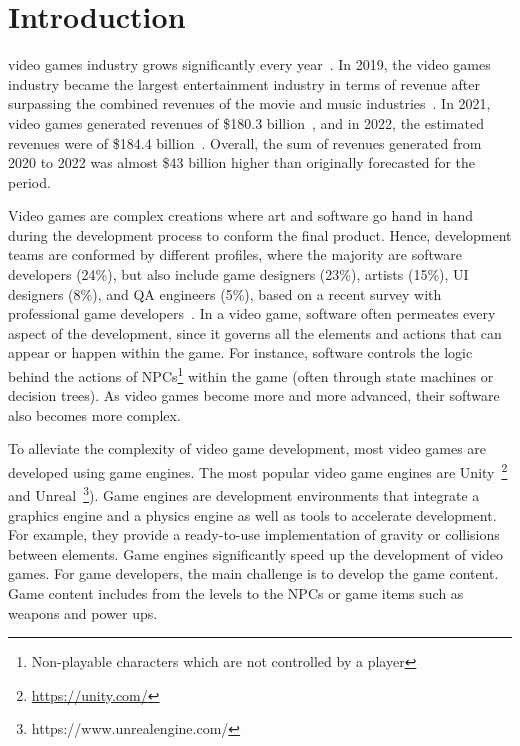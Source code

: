 \section{Introduction}

 video games industry grows significantly every year~\cite{rykala2020growth}. In 2019, the video games industry became the largest entertainment industry in terms of revenue after surpassing the combined revenues of the movie and music industries~\cite{politowski2021game}. In 2021, video games generated revenues of \$180.3 billion~\cite{wijman2021games}, and in 2022, the estimated revenues were of \$184.4 billion~\cite{wijman2022games}. Overall, the sum of revenues generated from 2020 to 2022 was almost \$43 billion higher than originally forecasted for the period. 

Video games are complex creations where art and software go hand in hand during the development process to conform the final product. Hence, development teams are conformed by different profiles, where the majority are software developers (24\%), but also include game designers (23\%), artists (15\%), UI designers (8\%), and QA engineers (5\%), based on a recent survey with professional game developers~\cite{devNation}. In a video game, software often permeates every aspect of the development, since it governs all the elements and actions that can appear or happen within the game. For instance, software controls the logic behind the actions of NPCs\footnote{Non-playable characters which are not controlled by a player} within the game (often through state machines or decision trees). As video games become more and more advanced, their software also becomes more complex.

To alleviate the complexity of video game development, most video games are developed using game engines. The most popular video game engines are Unity~\footnote{\url{https://unity.com/}} and Unreal~\footnote{https://www.unrealengine.com/}). Game engines are development environments that integrate a graphics engine and a physics engine as well as tools to accelerate development. For example, they provide a ready-to-use implementation of gravity or collisions between elements. Game engines significantly speed up the development of video games. For game developers, the main challenge is to develop the game content. Game content includes from the levels to the NPCs or game items such as weapons and power ups.

